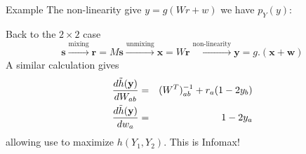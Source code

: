 \documentclass{beamer}
\newcommand{\crish}{\color{reddish}}
\newcommand{\cbla}{\color{black}}
\newcommand{\cred}{\color{red}}
\newcommand{\cblu}{\color{blue}}
\begin{document}
\begin{frame}{Example}
  The non-linearity give \crish$y=g(Wr+w)$\cbla{} we have \cblu$p_Y(y)$\cbla:
  \begin{center}
  \end{center}
\end{frame}


\begin{frame}{Back to the $2\times2$ case}
\cred
$$
\mathbf{ s}\stackrel{\mbox{mixing}}{\longrightarrow}\mathbf{ r}=M\mathbf{ s}\stackrel{\mbox{unmixing}}{\longrightarrow}\mathbf{ x}=W\mathbf{ r}\stackrel{\mbox{non-linearity}}{\longrightarrow}\mathbf{y}=g.(\mathbf{x}+\mathbf{w})
$$
\cbla
A similar calculation gives
\crish
\begin{eqnarray*}
\frac{d\tilde{h}(\mathbf{y})}{dW_{ab}}&=&(W^T)^{-1}_{ab}+r_a(1-2y_b)\cr
\frac{d\tilde{h}(\mathbf{y})}{dw_a}&=&1-2y_a
\end{eqnarray*}
\cbla
allowing use to maximize \crish$h(Y_1,Y_2)$\cbla{}. This is Infomax!
\end{frame}
\end{document}
